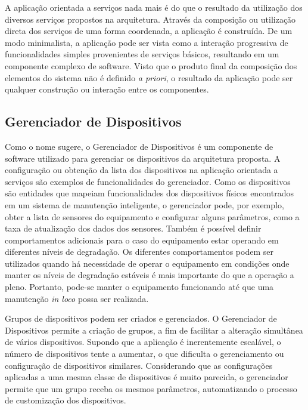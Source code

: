 A aplicação orientada a serviços
nada mais é do que o resultado da utilização dos diversos serviços propostos na arquitetura. Através
da composição ou utilização direta dos serviços de uma forma coordenada, a aplicação é construída.
De um modo minimalista, a aplicação pode ser vista como a interação progressiva de funcionalidades
simples provenientes de serviços básicos, resultando em um componente complexo de software. Visto
que o produto final da composição dos elementos do sistema não é definido \textit{a priori}, o
resultado da aplicação pode ser qualquer construção ou interação entre os componentes.


\subsection{Gerenciador de Dispositivos}
\label{sub:proposta-gerenciador-dispositivos}

Como o nome sugere, o Gerenciador de Dispositivos é um componente de software utilizado para
gerenciar os dispositivos da arquitetura proposta. A configuração ou obtenção da lista dos
dispositivos na aplicação orientada a serviços são exemplos de funcionalidades do gerenciador. Como
os dispositivos são entidades que mapeiam funcionalidades dos dispositivos físicos encontrados em um
sistema de manutenção inteligente, o gerenciador pode, por exemplo, obter a lista de sensores do
equipamento e configurar alguns parâmetros, como a taxa de atualização dos dados dos sensores.
Também é possível definir comportamentos adicionais para o caso do equipamento estar operando em
diferentes níveis de degradação. Os diferentes comportamentos podem ser utilizados quando há
necessidade de operar o equipamento em condições onde manter os níveis de degradação estáveis é mais
importante do que a operação a pleno. Portanto, pode-se manter o equipamento funcionando até que uma
manutenção \textit{in loco} possa ser realizada.

Grupos de dispositivos podem ser criados e gerenciados. O Gerenciador de Dispositivos permite a
criação de grupos, a fim de facilitar a alteração simultânea de vários dispositivos. Supondo que a
aplicação é inerentemente escalável, o número de dispositivos tente a aumentar, o que dificulta o
gerenciamento ou configuração de dispositivos similares. Considerando que as configurações aplicadas
a uma mesma classe de dispositivos é muito parecida, o gerenciador permite que um grupo receba os
mesmos parâmetros, automatizando o processo de customização dos dispositivos.

